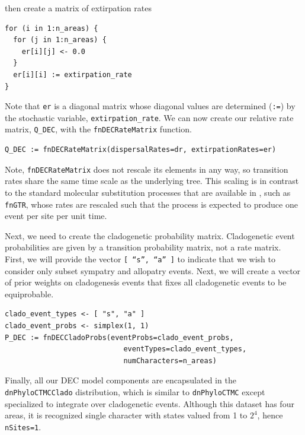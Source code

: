 then create a matrix of extirpation rates

\begin{snugshade}
\begin{lstlisting}
for (i in 1:n_areas) {
  for (j in 1:n_areas) {
    er[i][j] <- 0.0        
  }
  er[i][i] := extirpation_rate
}
\end{lstlisting}
\end{snugshade}

Note that {\tt er} is a diagonal matrix whose diagonal values are determined ({\tt :=}) by the stochastic variable, {\tt extirpation\_rate}.
We can now create our relative rate matrix, {\tt Q\_DEC}, with the {\tt fnDECRateMatrix} function.

\begin{snugshade}
\begin{lstlisting}
Q_DEC := fnDECRateMatrix(dispersalRates=dr, extirpationRates=er)
\end{lstlisting}
\end{snugshade}

Note, {\tt fnDECRateMatrix} does not rescale its elements in any way, so transition rates share the same time scale as the underlying tree.
This scaling is in contrast to the standard molecular substitution processes that are available in \RevBayes, such as {\tt fnGTR}, whose rates are rescaled such that the process is expected to produce one event per site per unit time.

Next, we need to create the cladogenetic probability matrix.
Cladogenetic event probabilities are given by a transition probability matrix, not a rate matrix.
First, we will provide the vector {\tt [ ``s'', ``a'' ]} to indicate that we wish to consider only subset sympatry and allopatry events.
Next, we will create a vector of prior weights on cladogenesis events that fixes all cladogenetic events to be equiprobable.

\begin{snugshade}
\begin{lstlisting}
clado_event_types <- [ "s", "a" ]
clado_event_probs <- simplex(1, 1)
P_DEC := fnDECCladoProbs(eventProbs=clado_event_probs,
                            eventTypes=clado_event_types,
                            numCharacters=n_areas)
\end{lstlisting}
\end{snugshade}

Finally, all our DEC model components are encapsulated in the {\tt dnPhyloCTMCClado} distribution, which is similar to {\tt dnPhyloCTMC} except specialized to integrate over cladogenetic events.
Although this dataset has four areas, it is recognized single character with states valued from 1 to $2^4$, hence {\tt nSites=1}.

